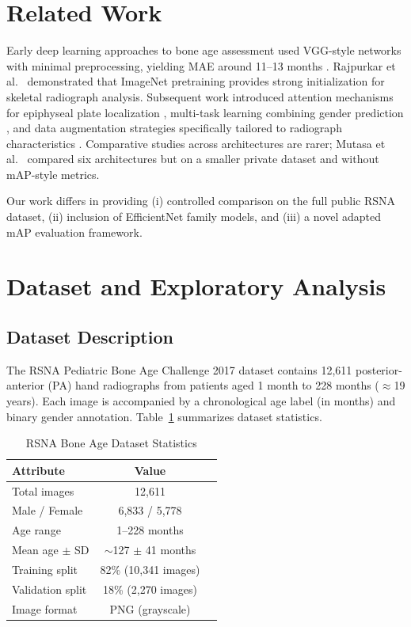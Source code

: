 \documentclass[conference]{IEEEtran}
\begin{document}
\section{Related Work}

Early deep learning approaches to bone age assessment used VGG-style
networks with minimal preprocessing, yielding MAE around 11--13 months
\cite{lee2017fully}. Rajpurkar et al.\ \cite{rajpurkar2017mura} demonstrated that
ImageNet pretraining provides strong initialization for skeletal
radiograph analysis. Subsequent work introduced attention mechanisms for epiphyseal plate
localization \cite{spampinato2017deep}, multi-task learning combining
gender prediction \cite{liu2019bone}, and data augmentation strategies
specifically tailored to radiograph characteristics \cite{iglovikov2018ternausnet}.
Comparative studies across architectures are rarer; Mutasa et al.\
\cite{mutasa2020understanding} compared six architectures but on a
smaller private dataset and without mAP-style metrics.

Our work differs in providing (i) controlled comparison on the full
public RSNA dataset, (ii) inclusion of EfficientNet family models, and
(iii) a novel adapted mAP evaluation framework.

\section{Dataset and Exploratory Analysis}

\subsection{Dataset Description}

The RSNA Pediatric Bone Age Challenge 2017 dataset \cite{rsna2017}
contains 12{,}611 posterior-anterior (PA) hand radiographs from
patients aged 1 month to 228 months ($\approx$19 years). Each image
is accompanied by a chronological age label (in months) and binary
gender annotation. Table~\ref{tab:dataset} summarizes dataset statistics.

\begin{table}[H]
\centering
\caption{RSNA Bone Age Dataset Statistics}
\label{tab:dataset}
\renewcommand{\arraystretch}{1.2}
\begin{tabular}{lcc}
\toprule
\textbf{Attribute} & \textbf{Value} \\
\midrule
Total images      & 12{,}611 \\
Male / Female     & 6{,}833 / 5{,}778 \\
Age range         & 1--228 months \\
Mean age $\pm$ SD & $\sim$127 $\pm$ 41 months \\
Training split    & 82\% (10{,}341 images) \\
Validation split  & 18\% (2{,}270 images) \\
Image format      & PNG (grayscale) \\
\bottomrule
\end{tabular}
\end{table}
\end{document}
